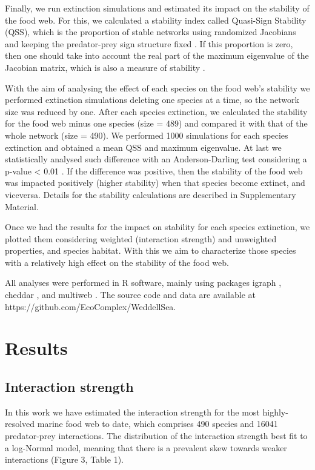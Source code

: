 \documentclass[gc, manuscript]{copernicus}
\begin{document}
Finally, we run extinction simulations and estimated its impact on the
stability of the food web. For this, we calculated a stability index
called Quasi-Sign Stability (QSS), which is the proportion of stable
networks using randomized Jacobians and keeping the predator-prey sign
structure fixed \citep{Allesina2008}. If this proportion is zero, then
one should take into account the real part of the maximum eigenvalue of
the Jacobian matrix, which is also a measure of stability
\citep{Grilli2016}.

With the aim of analysing the effect of each species on the food web's
stability we performed extinction simulations deleting one species at a
time, so the network size was reduced by one. After each species
extinction, we calculated the stability for the food web minus one
species (size = 489) and compared it with that of the whole network
(size = 490). We performed 1000 simulations for each species extinction
and obtained a mean QSS and maximum eigenvalue. At last we statistically
analysed such difference with an Anderson-Darling test considering a
p-value \textless{} 0.01 \citep{Scholz1987}. If the difference was
positive, then the stability of the food web was impacted positively
(higher stability) when that species become extinct, and viceversa.
Details for the stability calculations are described in Supplementary
Material.

Once we had the results for the impact on stability for each species
extinction, we plotted them considering weighted (interaction strength)
and unweighted properties, and species habitat. With this we aim to
characterize those species with a relatively high effect on the
stability of the food web.

All analyses were performed in R software, mainly using packages igraph
\citep{Csardi2005}, cheddar \citep{Hudson2013}, and multiweb
\citep{Saravia2019}. The source code and data are available at
https://github.com/EcoComplex/WeddellSea.

\section{Results}

\subsection{Interaction strength}

In this work we have estimated the interaction strength for the most
highly-resolved marine food web to date, which comprises 490 species and
16041 predator-prey interactions. The distribution of the interaction
strength best fit to a log-Normal model, meaning that there is a
prevalent skew towards weaker interactions (Figure 3, Table 1).
\end{document}
